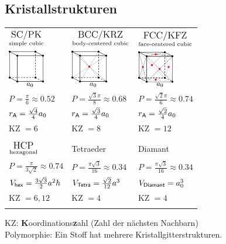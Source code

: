 \documentclass[fs, footer]{latex4ei}
\begin{document}
\begin{multicols*}{4}
{	\subsection{Kristallstrukturen}
\begin{tabular*}{\columnwidth}{@{\extracolsep\fill}lll@{}}
	$\underset{\text{simple cubic}}{\text{\large SC/PK}}$ & $\underset{\text{body-centered cubic}}{\text{\large BCC/KRZ}}$ & $\underset{\text{face-centered cubic}}{\text{\large FCC/KFZ}}$\\ \mrule
	\includegraphics[width = 1.6cm]{./img/sc.pdf} & \includegraphics[width = 1.6cm]{./img/bcc.pdf} & \includegraphics[width = 1.6cm]{./img/fcc.pdf}\\
	$P = \frac{\pi}{6} \approx 0.52$ & $P = \frac{\sqrt{3}\pi}{8} \approx 0.68$ & $P = \frac{\sqrt{2}\pi}{6} \approx 0.74$\\[0.5em]
	$r_{\sf A} = \frac{\sqrt{4}}{4} a_0$ & $r_{\sf A} = \frac{\sqrt{3}}{4} a_0$ & $r_{\sf A} = \frac{\sqrt{2}}{4} a_0$\\[0.5em]
	KZ $=6$ & KZ $=8$ & KZ $=12$\\
	\\
	$\underset{\text{hexagonal}}{\text{\large HCP}}$ & \large Tetraeder & \large Diamant\\ \mrule
	$P = \frac{\pi}{3 \sqrt{2}} \approx 0.74$ & $P = \frac{\pi \sqrt{3}}{16} \approx 0.34$ & $P = \frac{\pi \sqrt{3}}{16} \approx 0.34$\\
	$V_{\sf hex} = \frac{3\sqrt{3}}{2} a^2 h$ & $V_{\sf Tetra} = \frac{\sqrt{2}}{12}a^3$ & $V_{\sf Diamant} = a_0^3$\\
	KZ $=6,12$ & KZ $=4$ & KZ $=4$\\ \\
\end{tabular*}
	 KZ: \textbf{K}oordinations\textbf{z}ahl (Zahl der nächsten Nachbarn)\\
	 Polymorphie: Ein Stoff hat mehrere Kristallgitterstrukturen.
}


\end{multicols*}
\end{document}
